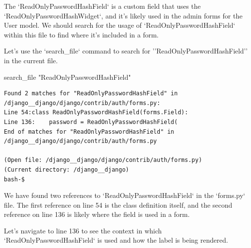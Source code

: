 {\begin{agentbox}
The `ReadOnlyPasswordHashField` is a custom field that uses the `ReadOnlyPasswordHashWidget`, and it's likely used in the admin forms for the User model. We should search for the usage of `ReadOnlyPasswordHashField` within this file to find where it's included in a form.



Let's use the `search\_file` command to search for ''ReadOnlyPasswordHashField'' in the current file.



\hrulefill
\begin{CodeVerbatim}[breaklines=true, breakanywhere=true]
search_file "ReadOnlyPasswordHashField"
\end{CodeVerbatim}
\end{agentbox}
\begin{observationbox}\begin{Verbatim}[breaklines=true, breakanywhere=true]
Found 2 matches for "ReadOnlyPasswordHashField" in /django__django/django/contrib/auth/forms.py:
Line 54:class ReadOnlyPasswordHashField(forms.Field):
Line 136:    password = ReadOnlyPasswordHashField(
End of matches for "ReadOnlyPasswordHashField" in /django__django/django/contrib/auth/forms.py

(Open file: /django__django/django/contrib/auth/forms.py)
(Current directory: /django__django)
bash-$
\end{Verbatim}
\end{observationbox}
\begin{agentbox}
We have found two references to `ReadOnlyPasswordHashField` in the `forms.py` file. The first reference on line 54 is the class definition itself, and the second reference on line 136 is likely where the field is used in a form.



Let's navigate to line 136 to see the context in which `ReadOnlyPasswordHashField` is used and how the label is being rendered.




\end{agentbox}}
